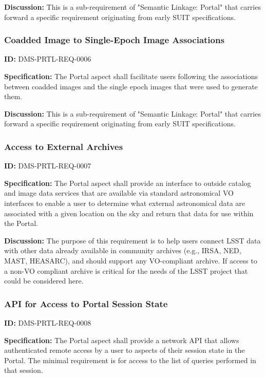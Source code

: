 \documentclass[SE,toc]{lsstdoc}
\begin{document}
\textbf{Discussion:}
This is a sub-requirement of "Semantic Linkage: Portal" that carries forward a specific requirement originating from early SUIT specifications.

\subsubsection{Coadded Image to Single-Epoch Image Associations}

\label{DMS-PRTL-REQ-0006}
\textbf{ID:} DMS-PRTL-REQ-0006

\textbf{Specification:}
The Portal aspect shall facilitate users following the associations between coadded images and the single epoch images that were used to generate them.

\textbf{Discussion:}
This is a sub-requirement of "Semantic Linkage: Portal" that carries forward a specific requirement originating from early SUIT specifications.

\subsubsection{Access to External Archives}

\label{DMS-PRTL-REQ-0007}
\textbf{ID:} DMS-PRTL-REQ-0007

\textbf{Specification:}
The Portal aspect shall provide an interface to outside catalog and image data services that are available via standard astronomical VO interfaces to enable a user to determine what external astronomical data are associated with a given location on the sky and return that data for use within the Portal.

\textbf{Discussion:}
The purpose of this requirement is to help users connect LSST data with other data already available in community archives (e.g., IRSA, NED, MAST, HEASARC), and should support any VO-compliant archive.  If access to a non-VO compliant archive is critical for the needs of the LSST project that could be considered here.

\subsubsection{API for Access to Portal Session State}

\label{DMS-PRTL-REQ-0008}
\textbf{ID:} DMS-PRTL-REQ-0008

\textbf{Specification:}
The Portal aspect shall provide a network API that allows authenticated remote access by a user to aspects of their session state in the Portal.  The minimal requirement is for access to the list of queries performed in that session.
\end{document}
